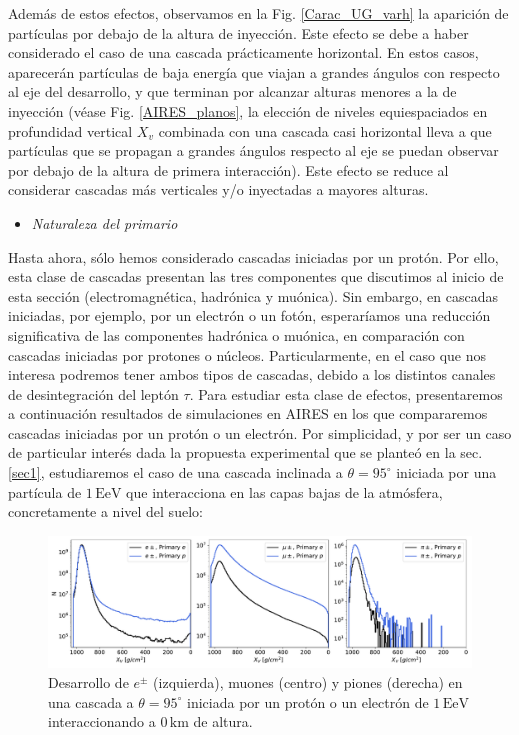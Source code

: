 \documentclass[11 pt, a4paper]{article} %
\numberwithin{equation}{section}
\numberwithin{figure}{section}
\numberwithin{table}{section}
\begin{document}
Además de estos efectos, observamos en la Fig. \ref{Carac_UG_varh} la aparición de partículas por debajo de la altura de inyección. Este efecto se debe a haber considerado el caso de una cascada prácticamente horizontal. En estos casos, aparecerán partículas de baja energía que viajan a grandes ángulos con respecto al eje del desarrollo, y que terminan por alcanzar alturas menores a la de inyección (véase Fig. \ref{AIRES_planos}, la elección de niveles equiespaciados en profundidad vertical $X_v$ combinada con una cascada casi horizontal lleva a que partículas que se propagan a grandes ángulos respecto al eje se puedan observar por debajo de la altura de primera interacción). Este efecto se reduce al considerar cascadas más verticales y/o inyectadas a mayores alturas. 
\begin{itemize}
	\item \textit{Naturaleza del primario}
\end{itemize}
Hasta ahora, sólo hemos considerado cascadas iniciadas por un protón. Por ello, esta clase de cascadas presentan las tres componentes que discutimos al inicio de esta sección (electromagnética, hadrónica y muónica). Sin embargo, en cascadas iniciadas, por ejemplo, por un electrón o un fotón, esperaríamos una reducción significativa de las componentes hadrónica o muónica, en comparación con cascadas iniciadas por protones o núcleos. Particularmente, en el caso que nos interesa podremos tener ambos tipos de cascadas, debido a los distintos canales de desintegración del leptón $\tau$. Para estudiar esta clase de efectos, presentaremos a continuación resultados de simulaciones en AIRES en los que compararemos cascadas iniciadas por un protón o un electrón. Por simplicidad, y por ser un caso de particular interés dada la propuesta experimental que se planteó en la sec. \ref{sec1}, estudiaremos el caso de una cascada inclinada a $\theta = 95^\circ$ iniciada por una partícula de $1\,\mathrm{EeV}$ que interacciona en las capas bajas de la atmósfera, concretamente a nivel del suelo:

\begin{figure}[H]
	\centering
	\includegraphics[width=1\linewidth]{figures/cascadas/upgoing_pe_1EeV_95deg_0km_v2}
	\caption{Desarrollo de $e^\pm$ (izquierda), muones (centro) y piones (derecha) en una cascada a $\theta = 95^\circ$ iniciada por un protón o un electrón de $1\,\mathrm{EeV}$ interaccionando a $0\,\mathrm{km}$ de altura.}
	\label{Carac_UG_varprim}
\end{figure}
\end{document}
